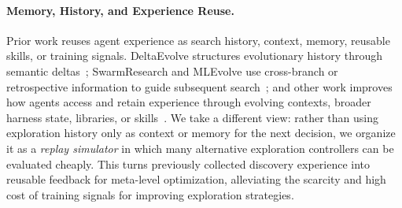 \paragraph{Memory, History, and Experience Reuse.}
Prior work reuses agent experience as search history, context, memory, reusable skills, or training signals. DeltaEvolve structures evolutionary history through semantic deltas~\citep{jiang2026deltaevolve}; SwarmResearch and MLEvolve use cross-branch or retrospective information to guide subsequent search~\citep{virk2026swarmresearch,du2026mlevolve}; and other work improves how agents access and retain experience through evolving contexts, broader harness state, libraries, or skills~\citep{zhang2026agentic,lee2026meta,xu2026test,ouyang2026skillos}. We take a different view: rather than using exploration history only as context or memory for the next decision, we organize it as a \emph{replay simulator} in which many alternative exploration controllers can be evaluated cheaply. This turns previously collected discovery experience into reusable feedback for meta-level optimization, alleviating the scarcity and high cost of training signals for improving exploration strategies.
